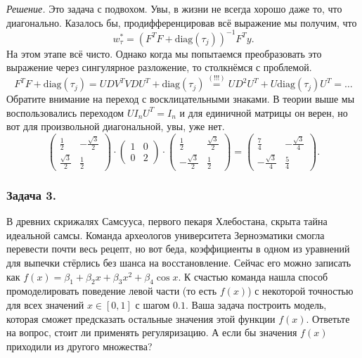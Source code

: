 \noindent\textit{Решение.} Это задача с подвохом. Увы, в жизни не всегда хорошо даже то, что диагонально. Казалось бы, продифференцировав всё выражение мы получим, что
$$w_\tau^* = (F^TF + \text{diag}(\tau_j))^{-1} F^Ty.$$
На этом этапе всё чисто. Однако когда мы попытаемся преобразовать это выражение через сингулярное разложение, то столкнёмся с проблемой.
$$F^TF + \text{diag}(\tau_j) = UDV^TVDU^T + \text{diag}(\tau_j) \overset{(!!!)}{=} UD^2U^T + U\text{diag}(\tau_j)U^T = \dots$$
Обратите внимание на переход с восклицательными знаками. В теории выше мы воспользовались переходом $U I_n U^T = I_n$ и для единичной матрицы он верен, но вот для произвольной диагональной, увы, уже нет.
$$\begin{pmatrix}
    \frac{1}{2}        & -\frac{\sqrt{3}}{2} \\
    \frac{\sqrt{3}}{2} & \frac{1}{2}
  \end{pmatrix} \cdot \begin{pmatrix}
    1 & 0  \\
    0 & 2
  \end{pmatrix} \cdot \begin{pmatrix}
    \frac{1}{2}         & \frac{\sqrt{3}}{2} \\
    -\frac{\sqrt{3}}{2} & \frac{1}{2}
  \end{pmatrix} = \begin{pmatrix}
    \frac{7}{4}         & -\frac{\sqrt{3}}{4} \\
    -\frac{\sqrt{3}}{4} & \frac{5}{4}
  \end{pmatrix}.$$

\subsubsection*{Задача 3.} В древних скрижалях Самсууса, первого пекаря Хлебостана, скрыта тайна идеальной самсы. Команда археологов университета Зерноэматики смогла перевести почти весь рецепт, но вот беда, коэффициенты в одном из уравнений для выпечки стёрлись без шанса на восстановление. Сейчас его можно записать как $f(x) = \beta_1 + \beta_2 x + \beta_3 x^2 + \beta_4 \cos x$. К счастью команда нашла способ промоделировать поведение левой части (то есть $f(x)$) с некоторой точностью для всех значений $x \in [0, 1]$ с шагом $0.1$. Ваша задача построить модель, которая сможет предсказать остальные значения этой функции $f(x)$. Ответьте на вопрос, стоит ли применять регуляризацию. А если бы значения $f(x)$ приходили из другого множества?

